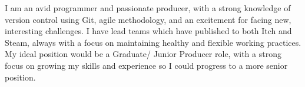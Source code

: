 

\begin{cvparagraph}
    I am an avid programmer and passionate producer, with a strong knowledge of version control using Git, agile methodology, and an excitement for facing new, interesting challenges. I have lead teams which have published to both Itch and Steam, always with a focus on maintaining healthy and flexible working practices. My ideal position would be a Graduate/ Junior Producer role, with a strong focus on growing my skills and experience so I could progress to a more senior position.
    
\end{cvparagraph}
